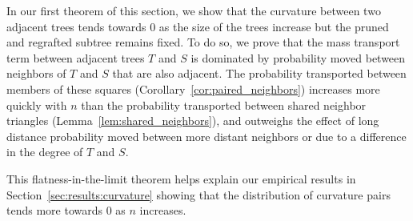 \documentclass[]{elsarticle}
\begin{document}
In our first theorem of this section, we show that the curvature between two adjacent trees tends towards 0 as the size of the trees increase but the pruned and regrafted subtree remains fixed.
To do so, we prove that the mass transport term between adjacent trees $T$ and $S$ is dominated by probability moved between neighbors of $T$ and $S$ that are also adjacent.
The probability transported between members of these squares (Corollary~\ref{cor:paired_neighbors}) increases more quickly with $n$ than the probability transported between shared neighbor triangles (Lemma~\ref{lem:shared_neighbors}), and outweighs the effect of long distance probability moved between more distant neighbors or due to a difference in the degree of $T$ and $S$.

This flatness-in-the-limit theorem helps explain our empirical results in Section~\ref{sec:results:curvature} showing that the distribution of curvature pairs tends more towards 0 as $n$ increases.
\end{document}
